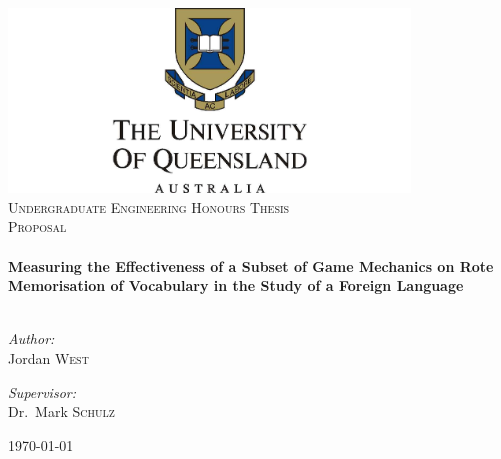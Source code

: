 \begin{titlepage}

\begin{center}


\includegraphics[width=0.8\textwidth]{./uqlogo.jpg}\\[1cm]    

\textsc{\Large Undergraduate Engineering Honours Thesis}\\[0.5cm]

\textsc{\LARGE Proposal}\\[0.5cm]


\HRule \\[0.4cm]
{ \Large \bfseries Measuring the Effectiveness of a Subset of Game Mechanics on Rote Memorisation of Vocabulary in the Study of a Foreign Language}\\[0.4cm]

\HRule \\[1.5cm]

\begin{minipage}{0.4\textwidth}
\begin{flushleft} \large
\emph{Author:}\\
Jordan \textsc{West}
\end{flushleft}
\end{minipage}
\begin{minipage}{0.4\textwidth}
\begin{flushright} \large
\emph{Supervisor:} \\
Dr.~Mark \textsc{Schulz}
\end{flushright}
\end{minipage}

\vfill

{\large \today}

\end{center}

\end{titlepage}
